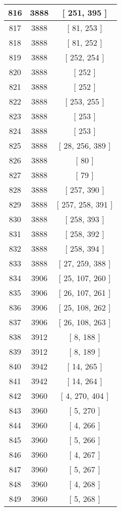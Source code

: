 \begin{center}
\begin{longtable}[H]{|| c c c ||}
\hline
816 & 3888 & [ 251, 395 ] \\ 
\hline
817 & 3888 & [ 81, 253 ] \\ 
\hline
818 & 3888 & [ 81, 252 ] \\ 
\hline
819 & 3888 & [ 252, 254 ] \\ 
\hline
820 & 3888 & [ 252 ] \\ 
\hline
821 & 3888 & [ 252 ] \\ 
\hline
822 & 3888 & [ 253, 255 ] \\ 
\hline
823 & 3888 & [ 253 ] \\ 
\hline
824 & 3888 & [ 253 ] \\ 
\hline
825 & 3888 & [ 28, 256, 389 ] \\ 
\hline
826 & 3888 & [ 80 ] \\ 
\hline
827 & 3888 & [ 79 ] \\ 
\hline
828 & 3888 & [ 257, 390 ] \\ 
\hline
829 & 3888 & [ 257, 258, 391 ] \\ 
\hline
830 & 3888 & [ 258, 393 ] \\ 
\hline
831 & 3888 & [ 258, 392 ] \\ 
\hline
832 & 3888 & [ 258, 394 ] \\ 
\hline
833 & 3888 & [ 27, 259, 388 ] \\ 
\hline
834 & 3906 & [ 25, 107, 260 ] \\ 
\hline
835 & 3906 & [ 26, 107, 261 ] \\ 
\hline
836 & 3906 & [ 25, 108, 262 ] \\ 
\hline
837 & 3906 & [ 26, 108, 263 ] \\ 
\hline
838 & 3912 & [ 8, 188 ] \\ 
\hline
839 & 3912 & [ 8, 189 ] \\ 
\hline
840 & 3942 & [ 14, 265 ] \\ 
\hline
841 & 3942 & [ 14, 264 ] \\ 
\hline
842 & 3960 & [ 4, 270, 404 ] \\ 
\hline
843 & 3960 & [ 5, 270 ] \\ 
\hline
844 & 3960 & [ 4, 266 ] \\ 
\hline
845 & 3960 & [ 5, 266 ] \\ 
\hline
846 & 3960 & [ 4, 267 ] \\ 
\hline
847 & 3960 & [ 5, 267 ] \\ 
\hline
848 & 3960 & [ 4, 268 ] \\ 
\hline
849 & 3960 & [ 5, 268 ] \\ 
\hline

\end{longtable}
\end{center}
